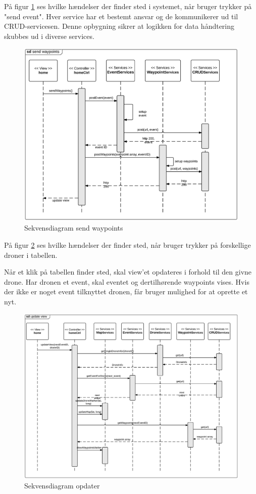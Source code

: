 \newpage
På figur \ref{fig:send_waypoints} ses hvilke hændelser der finder sted i systemet, når bruger trykker på "send event". Hver service har et bestemt ansvar og de kommunikerer ud til CRUD-servicesen. Denne opbygning sikrer at logikken for data håndtering skubbes ud i diverse services. 
\begin{figure}[H]
	\centering
	\includegraphics[width=1\textwidth]{Billeder/sekvens/sd_send_waypoints.png}
	\caption{Sekvensdiagram send waypoints}
	\label{fig:send_waypoints}
\end{figure}

\newpage
På figur \ref{fig:update_view} ses hvilke hændelser der finder sted, når bruger trykker på forskellige droner i tabellen. 

Når et klik på tabellen finder sted, skal view'et opdateres i forhold til den givne drone. Har dronen et event, skal eventet og dertilhørende waypoints vises. Hvis der ikke er noget event tilknyttet dronen, får bruger mulighed for at oprette et nyt.
\begin{figure}[H]
	\centering
	\includegraphics[width=1\textwidth]{Billeder/sekvens/sd_update_view.png}
	\caption{Sekvensdiagram opdater }
	\label{fig:update_view}
\end{figure}

